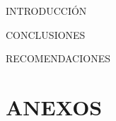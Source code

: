 \documentclass[unAutor, APA, hiperenlaces]{ThesisUTPL}
\begin{document}

%	
\begin{UnnumberedChapter}{INTRODUCCIÓN}
	
\end{UnnumberedChapter}
%
%
%
\ChapterFormat
%
%

%

%
%
\begin{UnnumberedChapter}{CONCLUSIONES}
	
\end{UnnumberedChapter}
%
\begin{UnnumberedChapter}{RECOMENDACIONES}
	
\end{UnnumberedChapter}
%
\appendix
%
\chapter{ANEXOS}
%



\paginaBibliografia{
	
}
	
\end{document}
